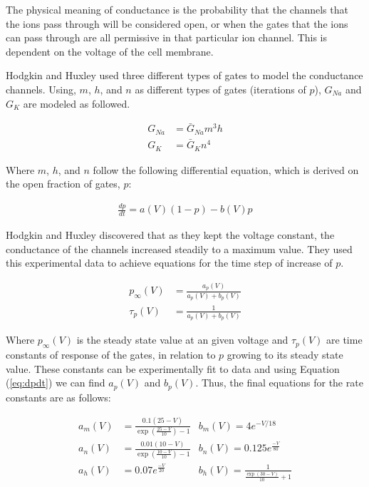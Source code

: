 \documentclass[12]{amsbook}
\newcommand\0{\mathbf{0}}
\newcommand\<{\langle}
\renewcommand\>{\rangle}
\begin{document}
The physical meaning of conductance is the probability that the channels that the ions pass through will be considered open, or when the gates that the ions can pass through are all permissive in that particular ion channel. This is dependent on the voltage of the cell membrane. 

Hodgkin and Huxley used three different types of gates to model the conductance channels. Using, $m$, $h$, and $n$ as different types of gates (iterations of $p$), $G_{Na}$ and $G_K$ are modeled as followed.

\begin{align*}
    G_{Na} &= \bar{G}_{Na}m^3h\\
    G_{K} &= \bar{G}_{K}n^4
\end{align*}

Where $m$, $h$, and $n$ follow the following differential equation, which is derived on the open fraction of gates, $p$:

\begin{align}
\label{eq:dpdt}
    \frac{dp}{dt} = a(V)(1-p) - b(V)p
\end{align}

Hodgkin and Huxley discovered that as they kept the voltage constant, the conductance of the channels increased steadily to a maximum value. They used this experimental data to achieve equations for the time step of increase of $p$.

\begin{align}
\label{eq:time}
    p_{\infty}(V) &= \frac{a_p(V)}{a_p(V) + b_p(V)} \\
    \tau_p(V) &= \frac{1}{a_p(V) + b_p(V)} 
\end{align}

Where $p_{\infty}(V)$ is the steady state value at an given voltage and ${\tau_p}(V)$ are time constants of response of the gates, in relation to $p$ growing to its steady state value. These constants can be experimentally fit to data and using Equation (\ref{eq:dpdt}) we can find $a_p(V)$ and $b_p(V)$. Thus, the final equations for the rate constants are as follows:

\begin{align*}
    a_m(V) &= \frac{0.1(25-V)}{\exp(\frac{25-V}{10})-1}
    &b_m(V) = 4e^{-V/18} \\
    a_n(V) &= \frac{0.01(10-V)}{\exp(\frac{10-V}{10})-1} 
    &b_n(V) = 0.125e^{\frac{-V}{80}}\\
    a_h(V) &= 0.07e^{\frac{-V}{20}} 
    &b_h(V) = \frac{1}{\frac{\exp(30-V)}{10}+1}
\end{align*}
\end{document}
